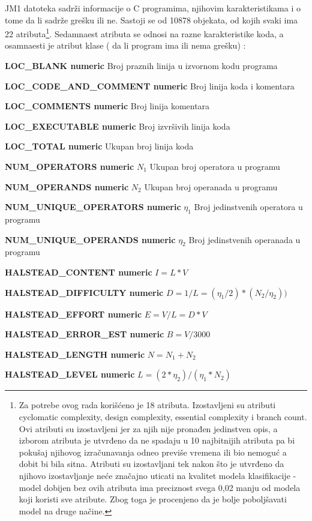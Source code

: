 \documentclass[12pt,oneside]{memoir}
\begin{document}
JM1 datoteka sadrži informacije o C programima, njihovim karakteristikama i o tome da li sadrže grešku ili ne. Sastoji se od 10878 objekata, od kojih svaki ima 22 atributa\footnote{Za potrebe ovog rada korišćeno je 18 atributa.  Izostavljeni su atributi cyclomatic complexity, design complexity, essential complexity i branch count. Ovi atributi su izostavljeni jer za njih nije pronađen jedinstven opis, a izborom atributa je utvrđeno da ne spadaju u 10 najbitnijih atributa pa bi pokušaj njihovog izračunavanja odneo previše vremena ili bio nemoguć a dobit bi bila sitna. Atributi su izostavljani tek nakon što je utvrđeno da njihovo izostavljanje neće značajno uticati na kvalitet modela klasifikacije - model dobijen bez ovih atributa ima preciznost svega 0,02 manju od modela koji koristi sve atribute. Zbog toga je procenjeno da je bolje poboljšavati model na druge načine. }. Sedamnaest atributa se odnosi na razne karakteristike koda, a osamnaesti je atribut klase ( da li program ima ili nema grešku) \cite{jm1}: 

\textbf{LOC\_BLANK numeric } Broj praznih linija u izvornom kodu programa

\textbf{LOC\_CODE\_AND\_COMMENT numeric} Broj linija koda i komentara

\textbf{LOC\_COMMENTS numeric} Broj linija komentara

\textbf{LOC\_EXECUTABLE numeric} Broj izvršivih linija koda

\textbf{LOC\_TOTAL numeric} Ukupan broj linija koda

\textbf{NUM\_OPERATORS numeric} $N_1$ Ukupan broj operatora u programu

\textbf{NUM\_OPERANDS numeric} $N_2$ Ukupan broj operanada u programu

\textbf{NUM\_UNIQUE\_OPERATORS numeric} $\eta_1$ Broj jedinstvenih operatora u programu

\textbf{NUM\_UNIQUE\_OPERANDS numeric} $\eta_2$ Broj jedinstvenih operanada u programu

\textbf{HALSTEAD\_CONTENT numeric} $I = L*V$

\textbf{HALSTEAD\_DIFFICULTY numeric} $D = 1/L = (\eta_1/2)*(N_2/\eta_2))$

\textbf{HALSTEAD\_EFFORT numeric} $E = V/L = D*V$

\textbf{HALSTEAD\_ERROR\_EST numeric} $B = V/3000$

\textbf{HALSTEAD\_LENGTH numeric} $N = N_1+N_2$

\textbf{HALSTEAD\_LEVEL numeric} $L = (2*\eta_2)/(\eta_1*N_2)$
\end{document}
